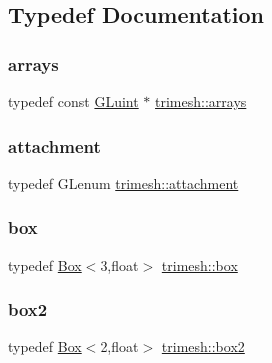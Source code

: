 \subsection{Typedef Documentation}
\mbox{\label{namespacetrimesh_afadd14df3ec31f9e1e9440ad474f9588}} 
\subsubsection{\texorpdfstring{arrays}{arrays}}
{\footnotesize\ttfamily typedef const \hyperlink{namespacetrimesh_ad2289423ef47b393854afc30451d433b}{G\+Luint} $\ast$ \hyperlink{namespacetrimesh_afadd14df3ec31f9e1e9440ad474f9588}{trimesh\+::arrays}}

\mbox{\label{namespacetrimesh_a548b4466ae8f9f5803366fdd5d6b26ea}} 
\subsubsection{\texorpdfstring{attachment}{attachment}}
{\footnotesize\ttfamily typedef G\+Lenum \hyperlink{namespacetrimesh_a548b4466ae8f9f5803366fdd5d6b26ea}{trimesh\+::attachment}}

\mbox{\label{namespacetrimesh_aaa1e325da32038bae3d7e0a4d0b82595}} 
\subsubsection{\texorpdfstring{box}{box}}
{\footnotesize\ttfamily typedef \hyperlink{classtrimesh_1_1Box}{Box}$<$3,float$>$ \hyperlink{namespacetrimesh_aaa1e325da32038bae3d7e0a4d0b82595}{trimesh\+::box}}

\mbox{\label{namespacetrimesh_aa7a0431b51a4f26529220102f2c3fbaf}} 
\subsubsection{\texorpdfstring{box2}{box2}}
{\footnotesize\ttfamily typedef \hyperlink{classtrimesh_1_1Box}{Box}$<$2,float$>$ \hyperlink{namespacetrimesh_aa7a0431b51a4f26529220102f2c3fbaf}{trimesh\+::box2}}

